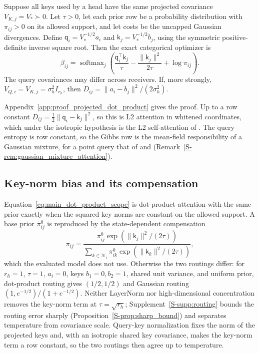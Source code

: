 \documentclass[twoside,11pt]{article}
\newcommand{\softmax}{\operatorname{softmax}}
\begin{document}
\begin{proposition}
\label{prop:projected_dot_product}
Suppose all keys used by a head have the same projected covariance $V_{K,j}=V_*\succ0$. Let $\tau>0$, let each prior row be a probability distribution with $\pi_{ij}>0$ on its allowed support, and let costs be the uncapped Gaussian divergences. Define $\mathsf q_i=V_*^{-1/2}a_i$ and $\mathsf k_j=V_*^{-1/2}b_j$, using the symmetric positive-definite inverse square root. Then the exact categorical optimizer is
\begin{equation}
\beta_{ij}=\softmax_j\left(
\frac{\mathsf q_i^\top\mathsf k_j}{\tau}
-\frac{\|\mathsf k_j\|^2}{2\tau}
+\log\pi_{ij}\right).
\label{eq:main_dot_product_scope}
\end{equation}
The query covariances may differ across receivers. If, more strongly, $V_{Q,i}=V_{K,j}=\sigma_h^2I_{r_h}$, then $D_{ij}=\|a_i-b_j\|^2/(2\sigma_h^2)$.
\end{proposition}
Appendix~\ref{app:proof_projected_dot_product} gives the proof. Up to a row constant $D_{ij}=\tfrac12\|\mathsf q_i-\mathsf k_j\|^2$, so this is L2 attention in whitened coordinates, which under the isotropic hypothesis is the L2 self-attention of \citet{Kim2021Lipschitz}. The query entropy is row constant, so the Gibbs row is the mean-field responsibility of a Gaussian mixture, for a point query that of \citet{Movellan2020ProbabilisticTransformers} and \citet{Nguyen2022MGK} (Remark~\ref{S-rem:gaussian_mixture_attention}).

\subsection{Key-norm bias and its compensation}
\label{sec:bias_cancellation}
Equation~\eqref{eq:main_dot_product_scope} is dot-product attention with the same prior exactly when the squared key norms are constant on the allowed support. A base prior $\pi^0_{ij}$ is reproduced by the state-dependent compensation
\begin{equation}
\pi_{ij}=
\frac{\pi^0_{ij}\exp(\|\mathsf k_j\|^2/(2\tau))}
{\sum_{k\in\mathcal N_i}\pi^0_{ik}\exp(\|\mathsf k_k\|^2/(2\tau))},
\label{eq:projected_key_bias_compensation}
\end{equation}
which the evaluated model does not use. Otherwise the two routings differ: for $r_h=1$, $\tau=1$, $a_i=0$, keys $b_1=0,b_2=1$, shared unit variance, and uniform prior, dot-product routing gives $(1/2,1/2)$ and Gaussian routing $(1,e^{-1/2})/(1+e^{-1/2})$. Neither LayerNorm nor high-dimensional concentration removes the key-norm term at $\tau=\sqrt{r_h}$; Supplement~\ref{S-supp:routing} bounds the routing error sharply (Proposition~\ref{S-prop:sharp_bound}) and separates temperature from covariance scale. Query-key normalization \citep{Henry2020QKNorm} fixes the norm of the projected keys and, with an isotropic shared key covariance, makes the key-norm term a row constant, so the two routings then agree up to temperature.
\end{document}
